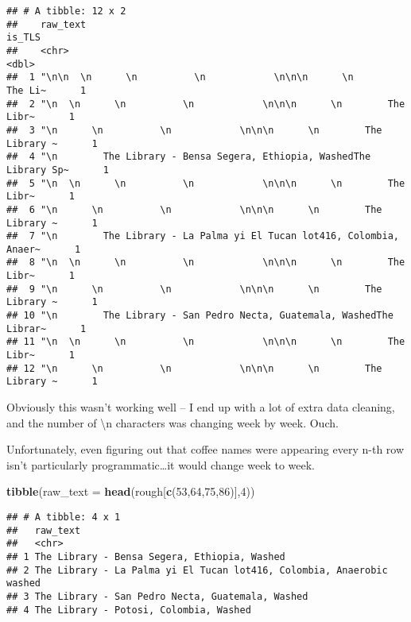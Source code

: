 \documentclass[]{article}
\newenvironment{Shaded}{\begin{snugshade}}{\end{snugshade}}
\newcommand{\DataTypeTok}[1]{\textcolor[rgb]{0.13,0.29,0.53}{#1}}
\newcommand{\DecValTok}[1]{\textcolor[rgb]{0.00,0.00,0.81}{#1}}
\newcommand{\KeywordTok}[1]{\textcolor[rgb]{0.13,0.29,0.53}{\textbf{#1}}}
\newcommand{\NormalTok}[1]{#1}
\begin{document}
\begin{verbatim}
## # A tibble: 12 x 2
##    raw_text                                                               is_TLS
##    <chr>                                                                   <dbl>
##  1 "\n\n  \n      \n          \n            \n\n\n      \n        The Li~      1
##  2 "\n  \n      \n          \n            \n\n\n      \n        The Libr~      1
##  3 "\n      \n          \n            \n\n\n      \n        The Library ~      1
##  4 "\n        The Library - Bensa Segera, Ethiopia, WashedThe Library Sp~      1
##  5 "\n  \n      \n          \n            \n\n\n      \n        The Libr~      1
##  6 "\n      \n          \n            \n\n\n      \n        The Library ~      1
##  7 "\n        The Library - La Palma yi El Tucan lot416, Colombia, Anaer~      1
##  8 "\n  \n      \n          \n            \n\n\n      \n        The Libr~      1
##  9 "\n      \n          \n            \n\n\n      \n        The Library ~      1
## 10 "\n        The Library - San Pedro Necta, Guatemala, WashedThe Librar~      1
## 11 "\n  \n      \n          \n            \n\n\n      \n        The Libr~      1
## 12 "\n      \n          \n            \n\n\n      \n        The Library ~      1
\end{verbatim}

Obviously this wasn't working well -- I end up with a lot of extra data
cleaning, and the number of \textbackslash{}n characters was changing
week by week. Ouch.

Unfortunately, even figuring out that coffee names were appearing every
n-th row isn't particularly programmatic\ldots{}it would change week to
week.

\begin{Shaded}
\begin{Highlighting}[]
\KeywordTok{tibble}\NormalTok{(}\DataTypeTok{raw_text =} \KeywordTok{head}\NormalTok{(rough[}\KeywordTok{c}\NormalTok{(}\DecValTok{53}\NormalTok{,}\DecValTok{64}\NormalTok{,}\DecValTok{75}\NormalTok{,}\DecValTok{86}\NormalTok{)],}\DecValTok{4}\NormalTok{))}
\end{Highlighting}
\end{Shaded}

\begin{verbatim}
## # A tibble: 4 x 1
##   raw_text                                                             
##   <chr>                                                                
## 1 The Library - Bensa Segera, Ethiopia, Washed                         
## 2 The Library - La Palma yi El Tucan lot416, Colombia, Anaerobic washed
## 3 The Library - San Pedro Necta, Guatemala, Washed                     
## 4 The Library - Potosi, Colombia, Washed
\end{verbatim}
\end{document}
